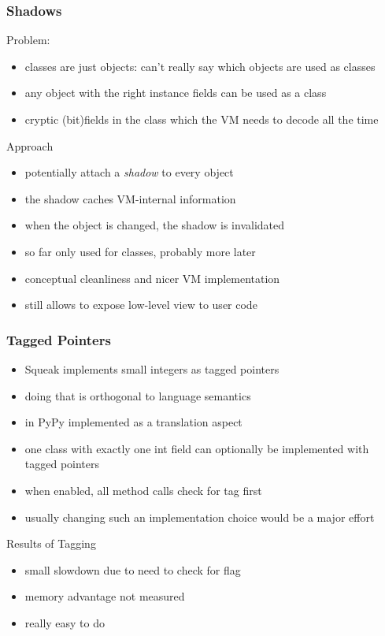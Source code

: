 \documentclass[utf8x]{beamer}
\begin{document}
\begin{frame}
    \frametitle{Shadows}
    Problem: 
    \begin{itemize}
    \item classes are just objects: can't really say which objects are used as classes
    \item any object with the right instance fields can be used as a class
    \item cryptic (bit)fields in the class which the VM needs to decode all the time
    \end{itemize}
    \pause
    \begin{block}{Approach}
        \begin{itemize}
        \item potentially attach a \emph{shadow} to every object
        \item the shadow caches VM-internal information
        \item when the object is changed, the shadow is invalidated
        \item so far only used for classes, probably more later
        \item conceptual cleanliness and nicer VM implementation
        \item still allows to expose low-level view to user code
        \end{itemize}
    \end{block}
\end{frame}

\begin{frame}
    \frametitle{Tagged Pointers}
    \begin{itemize}
    \item Squeak implements small integers as tagged pointers
    \item doing that is orthogonal to language semantics
    \item in PyPy implemented as a translation aspect
    \item one class with exactly one int field can optionally be implemented
    with tagged pointers
    \item when enabled, all method calls check for tag first
    \item usually changing such an implementation choice would be a major effort
    \end{itemize}
    \pause
    \begin{block}{Results of Tagging}
        \begin{itemize}
        \item small slowdown due to need to check for flag
        \item memory advantage not measured
        \item really easy to do
        \end{itemize}
    \end{block}
\end{frame}
\end{document}
